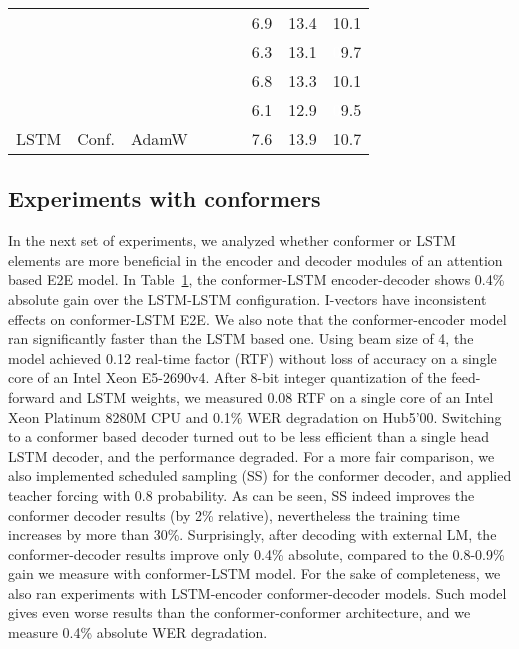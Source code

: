 \documentclass[a4paper]{article}
\begin{document}
\begin{table}
\begin{tabular}{|@{}c@{}|@{}c@{}|@{}c@{}|@{}c@{}|@{}c@{}|@{}c@{}|c|c|@{}c@{}|}
         &           &           & \multirow{4}{*}{} &              &              &   6.9      &  13.4      & 10.1 \\ \cline{6-9}
         &           &           &              &              &  &   6.3      &  13.1      & \textcolor{white}{0}9.7 \\ \cline{5-9}
         &           &           &              & \multirow{2}{*}{} &              &   6.8      &  13.3      & 10.1 \\ \cline{6-9}
         &           &           &              &              &  &   6.1      &  12.9      & \textcolor{white}{0}9.5 \\
\hline
\hline
 LSTM    &   Conf.   &  AdamW    &              &              &              &   7.6      &  13.9      & 10.7 \\
\hline
\end{tabular}                              
\label{tab:comp_lstm_conf}
\vspace{-2mm}
\end{table}

\vspace{-1.5mm}
\subsection{Experiments with conformers}
\label{sec:expconf}
\vspace{-1.5mm}
In the next set of experiments, we analyzed whether conformer or LSTM elements are more beneficial in the encoder and decoder modules of an attention based E2E model.
In Table~\ref{tab:comp_lstm_conf}, the conformer-LSTM encoder-decoder shows 0.4\% absolute gain over the LSTM-LSTM configuration.
I-vectors have inconsistent effects on conformer-LSTM E2E.
We also note that the conformer-encoder model ran significantly faster than the LSTM based one.
Using beam size of 4, the model achieved 0.12 real-time factor (RTF) without loss of accuracy on a single core of an Intel Xeon E5-2690v4.
After 8-bit integer quantization of the feed-forward and LSTM weights, we measured 0.08 RTF on a single core of an Intel Xeon Platinum 8280M CPU and 0.1\% WER degradation on Hub5'00.
Switching to a conformer based decoder turned out to be less efficient than a single head LSTM decoder, and the performance degraded.
For a more fair comparison, we also implemented scheduled sampling (SS) for the conformer decoder, and applied teacher forcing with 0.8 probability.
As can be seen, SS indeed improves the conformer decoder results (by 2\% relative), nevertheless the training time increases by more than 30\%.
Surprisingly, after decoding with external LM, the conformer-decoder results improve only 0.4\% absolute, compared to the 0.8-0.9\% gain we measure with conformer-LSTM model.
For the sake of completeness, we also ran experiments with LSTM-encoder conformer-decoder models.
Such model gives even worse results than the conformer-conformer architecture, and we measure 0.4\% absolute WER degradation.
\end{document}
